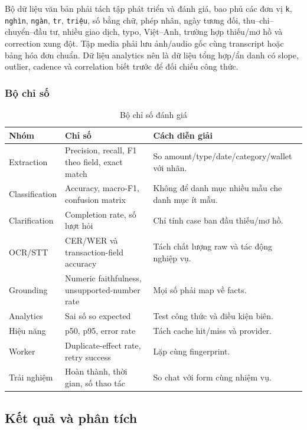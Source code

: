 Bộ dữ liệu văn bản phải tách tập phát triển và đánh giá, bao phủ các đơn vị \texttt{k}, \texttt{nghìn}, \texttt{ngàn}, \texttt{tr}, \texttt{triệu}, số bằng chữ, phép nhân, ngày tương đối, thu--chi--chuyển--đầu tư, nhiều giao dịch, typo, Việt--Anh, trường hợp thiếu/mơ hồ và correction xung đột. Tập media phải lưu ảnh/audio gốc cùng transcript hoặc bảng hóa đơn chuẩn. Dữ liệu analytics nên là dữ liệu tổng hợp/ẩn danh có slope, outlier, cadence và correlation biết trước để đối chiếu công thức.

\subsubsection{Bộ chỉ số}

\begin{table}[H]
  \centering
  \caption{Bộ chỉ số đánh giá}
  \label{tab:metrics}
  \begin{tabularx}{\textwidth}{@{}L{3.2cm}L{5.2cm}Y@{}}
    \toprule
    \textbf{Nhóm} & \textbf{Chỉ số} & \textbf{Cách diễn giải} \\
    \midrule
    Extraction & Precision, recall, F1 theo field, exact match & So amount/type/date/category/wallet với nhãn. \\
    Classification & Accuracy, macro-F1, confusion matrix & Không để danh mục nhiều mẫu che danh mục ít mẫu. \\
    Clarification & Completion rate, số lượt hỏi & Chỉ tính case ban đầu thiếu/mơ hồ. \\
    OCR/STT & CER/WER và transaction-field accuracy & Tách chất lượng raw và tác động nghiệp vụ. \\
    Grounding & Numeric faithfulness, unsupported-number rate & Mọi số phải map về facts. \\
    Analytics & Sai số so expected & Test công thức và điều kiện biên. \\
    Hiệu năng & p50, p95, error rate & Tách cache hit/miss và provider. \\
    Worker & Duplicate-effect rate, retry success & Lặp cùng fingerprint. \\
    Trải nghiệm & Hoàn thành, thời gian, số thao tác & So chat với form cùng nhiệm vụ. \\
    \bottomrule
  \end{tabularx}
\end{table}

\subsection{Kết quả và phân tích}

